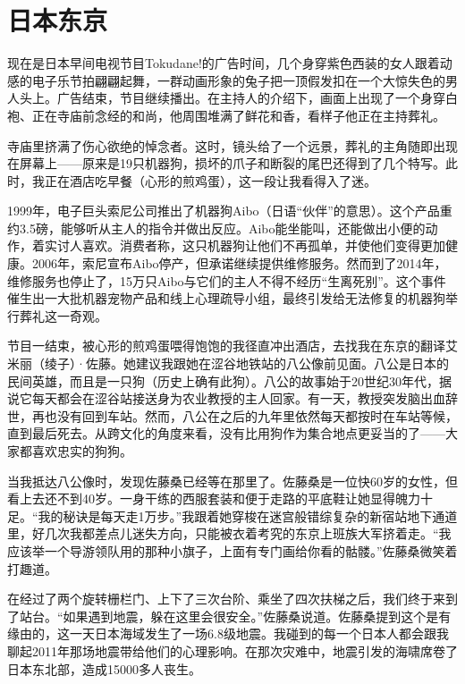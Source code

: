 \documentclass[12pt,oneside]{book}
\begin{document}
\section{日本东京}
\begin{bookref}[frametitle={\cite{好好告别：世界葬礼观察手记}}]

现在是日本早间电视节目Tokudane!的广告时间，几个身穿紫色西装的女人跟着动感的电子乐节拍翩翩起舞，一群动画形象的兔子把一顶假发扣在一个大惊失色的男人头上。广告结束，节目继续播出。在主持人的介绍下，画面上出现了一个身穿白袍、正在寺庙前念经的和尚，他周围堆满了鲜花和香，看样子他正在主持葬礼。

寺庙里挤满了伤心欲绝的悼念者。这时，镜头给了一个远景，葬礼的主角随即出现在屏幕上——原来是19只机器狗，损坏的爪子和断裂的尾巴还得到了几个特写。此时，我正在酒店吃早餐（心形的煎鸡蛋），这一段让我看得入了迷。

1999年，电子巨头索尼公司推出了机器狗Aibo（日语“伙伴”的意思）。这个产品重约3.5磅，能够听从主人的指令并做出反应。Aibo能坐能叫，还能做出小便的动作，着实讨人喜欢。消费者称，这只机器狗让他们不再孤单，并使他们变得更加健康。2006年，索尼宣布Aibo停产，但承诺继续提供维修服务。然而到了2014年，维修服务也停止了，15万只Aibo与它们的主人不得不经历“生离死别”。这个事件催生出一大批机器宠物产品和线上心理疏导小组，最终引发给无法修复的机器狗举行葬礼这一奇观。

节目一结束，被心形的煎鸡蛋喂得饱饱的我径直冲出酒店，去找我在东京的翻译艾米丽（绫子）·佐藤。她建议我跟她在涩谷地铁站的八公像前见面。八公是日本的民间英雄，而且是一只狗（历史上确有此狗）。八公的故事始于20世纪30年代，据说它每天都会在涩谷站接送身为农业教授的主人回家。有一天，教授突发脑出血辞世，再也没有回到车站。然而，八公在之后的九年里依然每天都按时在车站等候，直到最后死去。从跨文化的角度来看，没有比用狗作为集合地点更妥当的了——大家都喜欢忠实的狗狗。

当我抵达八公像时，发现佐藤桑已经等在那里了。佐藤桑是一位快60岁的女性，但看上去还不到40岁。一身干练的西服套装和便于走路的平底鞋让她显得魄力十足。“我的秘诀是每天走1万步。”我跟着她穿梭在迷宫般错综复杂的新宿站地下通道里，好几次我都差点儿迷失方向，只能被衣着考究的东京上班族大军挤着走。“我应该举一个导游领队用的那种小旗子，上面有专门画给你看的骷髅。”佐藤桑微笑着打趣道。

在经过了两个旋转栅栏门、上下了三次台阶、乘坐了四次扶梯之后，我们终于来到了站台。“如果遇到地震，躲在这里会很安全。”佐藤桑说道。佐藤桑提到这个是有缘由的，这一天日本海域发生了一场6.8级地震。我碰到的每一个日本人都会跟我聊起2011年那场地震带给他们的心理影响。在那次灾难中，地震引发的海啸席卷了日本东北部，造成15000多人丧生。


\end{bookref}
\end{document}
